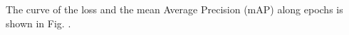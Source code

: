 \begin{table}[htb]
\centering
\caption{Hyperparameters for training}
\label{tab:Hyperparameters}
\end{table}

The curve of the loss and the mean Average Precision (mAP) along epochs is shown in Fig. .


